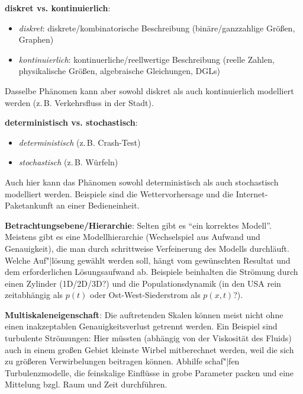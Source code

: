\textbf{diskret vs. kontinuierlich}:
\begin{itemize}
    \item
    \emph{diskret}:
    diskrete/kombinatorische Beschreibung
    (binäre/ganzzahlige Größen, Graphen)
    
    \item
    \emph{kontinuierlich}:
    kontinuerliche/reellwertige Beschreibung
    (reelle Zahlen, physikalische Größen, algebraische Gleichungen, DGLs)
\end{itemize}
Dasselbe Phänomen kann aber sowohl diskret als auch kontinuierlich modelliert werden
(z.\,B. Verkehrsfluss in der Stadt).

\linie

\textbf{deterministisch vs. stochastisch}:
\begin{itemize}
    \item
    \emph{deterministisch}
    (z.\,B. Crash-Test)
    
    \item
    \emph{stochastisch}
    (z.\,B. Würfeln)
\end{itemize}
Auch hier kann das Phänomen sowohl deterministisch als auch stochastisch modelliert werden.
Beispiele sind die Wettervorhersage und die Internet-Paketankunft an einer Bedieneinheit.

\linie

\textbf{Betrachtungsebene/Hierarchie}:
Selten gibt es "`ein korrektes Modell"'.
Meistens gibt es eine Modellhierarchie (Wechselspiel aus Aufwand und Genauigkeit),
die man durch schrittweise Verfeinerung des Modells durchläuft.
Welche Auf"|lösung gewählt werden soll, hängt vom gewünschten Resultat und dem erforderlichen
Lösungsaufwand ab.
Beispiele beinhalten die Strömung durch einen Zylinder (1D/2D/3D?) und
die Populationsdynamik
(in den USA rein zeitabhängig als $p(t)$ oder Ost-West-Siederstrom als $p(x, t)$?).

\textbf{Multiskaleneigenschaft}:
Die auftretenden Skalen können meist nicht ohne einen inakzeptablen Genauigkeitsverlust getrennt
werden.
Ein Beispiel sind turbulente Strömungen:
Hier müssten (abhängig von der Viskosität des Fluids) auch in einem großen Gebiet kleinste Wirbel
mitberechnet werden, weil die sich zu größeren Verwirbelungen beitragen können.
Abhilfe schaf"|fen Turbulenzmodelle, die feinskalige Einflüsse in grobe Parameter packen und
eine Mittelung bzgl. Raum und Zeit durchführen.

\pagebreak

